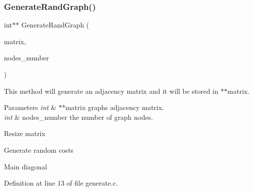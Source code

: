 \subsubsection{Generate\+Rand\+Graph()}
{\footnotesize\ttfamily int$\ast$$\ast$ Generate\+Rand\+Graph (\begin{DoxyParamCaption}\item[{int $\ast$$\ast$}]{matrix,  }\item[{int $\ast$}]{nodes\+\_\+number }\end{DoxyParamCaption})}

This method will generate an adjacency matrix and it will be stored in $\ast$$\ast$matrix. 
\begin{DoxyParams}{Parameters}
{\em int} & $\ast$$\ast$matrix graph\textquotesingle{}s adjacency matrix. \\
\hline
{\em int} & nodes\+\_\+number the number of graph nodes.\\
\hline
\end{DoxyParams}
Resize matrix

Generate random costs

Main diagonal 

Definition at line 13 of file generate.\+c.

